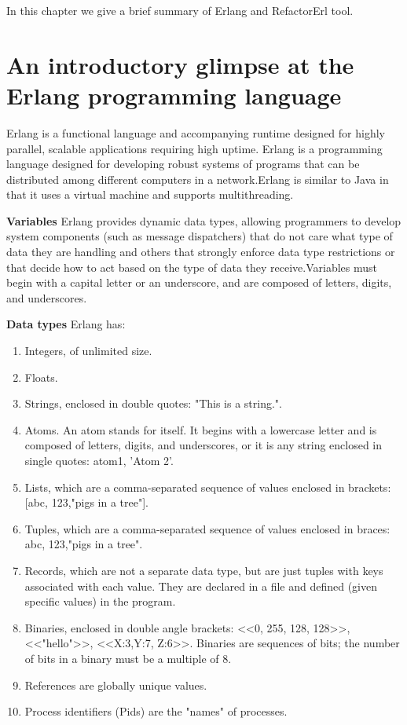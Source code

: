 
In this chapter we give a brief summary of Erlang and RefactorErl tool.

\section{An introductory glimpse at the Erlang programming language}
Erlang is a functional language and accompanying runtime designed for highly
parallel, scalable applications requiring high uptime. Erlang is a programming
language designed for developing robust systems of programs that can be distributed among different computers in a network.Erlang is similar to Java in that it uses a virtual machine and supports multithreading. 

\textbf{Variables}
Erlang provides dynamic data types, allowing programmers to develop system
components (such as message dispatchers) that do not care what type of data they are handling and others that strongly enforce data type restrictions or that decide how to act based on the type of data they receive.Variables must begin with a capital letter or an underscore, and are composed of letters, digits, and underscores.

\textbf{Data types}
Erlang has:
\begin{enumerate}
	\item Integers, of unlimited size.
	\item Floats.
	\item Strings, enclosed in double quotes: "This is a string.".
	\item Atoms. An atom stands for itself. It begins with a lowercase letter and is composed of letters, digits, and underscores, or it is any string enclosed in single quotes: atom1, 'Atom 2'.
	\item Lists, which are a comma-separated sequence of values enclosed in brackets: [abc, 123,"pigs in a tree"]. 
	\item Tuples, which are a comma-separated sequence of values enclosed in braces: {abc, 123,"pigs in a tree"}.
	\item Records, which are not a separate data type, but are just tuples with keys associated with each value. They are declared in a file and defined (given specific values) in the program.
	\item Binaries, enclosed in double angle brackets: <<0, 255, 128, 128>>, <<"hello">>, <<X:3,Y:7, Z:6>>. Binaries are sequences of bits; the number of bits in a binary must be a multiple of 8.
	\item References are globally unique values.
	\item Process identifiers (Pids) are the "names" of processes.
\end{enumerate}

